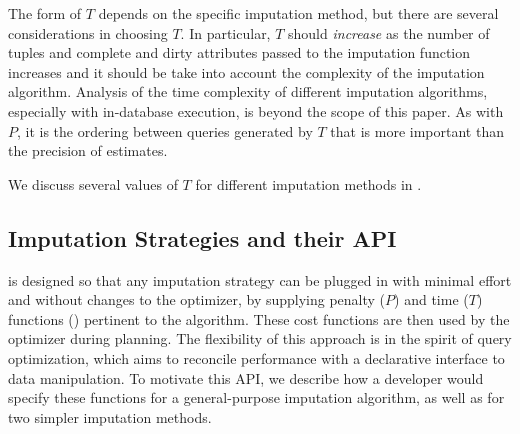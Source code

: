 {The form of $T$ depends on the specific imputation method, but there are several considerations in choosing $T$.
In particular, $T$ should \emph{increase} as the number of tuples and complete and dirty attributes passed to the imputation function increases and it should be take into account the complexity of the imputation algorithm.
Analysis of the time complexity of different imputation algorithms, especially with in-database execution, is beyond the scope of this paper.
As with $P$, it is the ordering between queries generated by $T$ that is more important than the precision of estimates.

We discuss several values of $T$ for different imputation methods in .



\subsection{Imputation Strategies and their API}
\label{sec:imputation}

\ProjectName{} is designed so that any imputation strategy can be plugged in with minimal effort and without changes to the optimizer, by supplying penalty ($P$) and time ($T$) functions () pertinent to the algorithm.
These cost functions are then used by the optimizer during planning.
The flexibility of this approach is in the spirit of query optimization, which aims to reconcile performance with a declarative interface to data manipulation.
To motivate this API, we describe how a developer would specify these functions for a general-purpose imputation algorithm, as well as for two simpler imputation methods.

}
